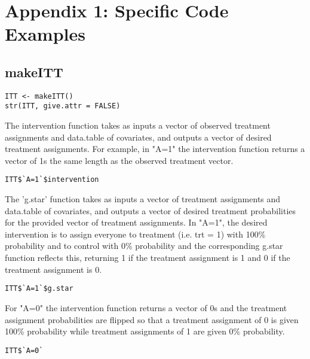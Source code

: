 \documentclass{report}
\newcommand{\1}{\ensuremath{\mathbf{1}}}
\begin{document}
\chapter{Appendix 1: Specific Code Examples}
\section{makeITT}

\begin{lstlisting}
ITT <- makeITT()
str(ITT, give.attr = FALSE)
\end{lstlisting}

The intervention function takes as inputs a vector of observed treatment assignments and data.table of covariates, and outputs a vector of desired treatment assignments. For example, in "A=1" the intervention function returns a vector of 1s the same length as the observed treatment vector.

\begin{lstlisting}
ITT$`A=1`$intervention
\end{lstlisting}

The 'g.star' function takes as inputs a vector of treatment assignments and data.table of covariates, and outputs a vector of desired treatment probabilities for the provided vector of treatment assignments. In "A=1", the desired intervention is to assign everyone to treatment (i.e. trt = 1) with 100\% probability and to control with 0\% probability and the corresponding g.star function reflects this, returning 1 if the treatment assignment is 1 and 0 if the treatment assignment is 0.

\begin{lstlisting}
ITT$`A=1`$g.star
\end{lstlisting}


For "A=0" the intervention function returns a vector of 0s and the treatment assignment probabilities are flipped so that a treatment assignment of 0 is given 100\% probability while treatment assignments of 1 are given 0\% probability.

\begin{lstlisting}
ITT$`A=0`
\end{lstlisting}
\end{document}
